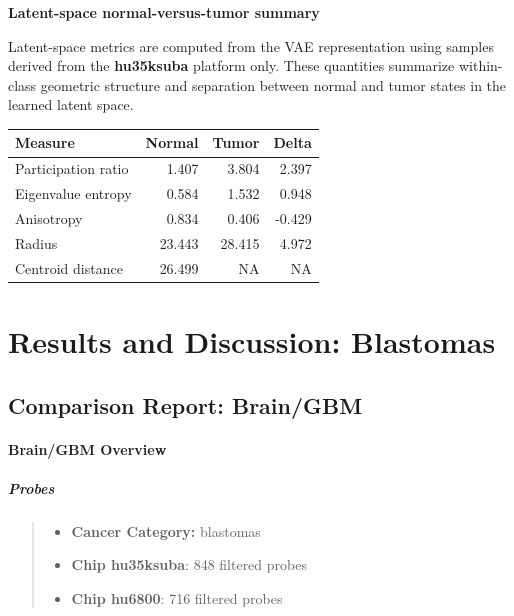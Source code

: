 \documentclass[
  letterpaper,
  DIV=11,
  numbers=noendperiod,
  openany,
  oneside]{scrreprt}
\providecommand{\tightlist}{%
  \setlength{\itemsep}{0pt}\setlength{\parskip}{0pt}}
\begin{document}
\textbf{Latent-space normal-versus-tumor summary}

Latent-space metrics are computed from the VAE representation using
samples derived from the \textbf{hu35ksuba} platform only. These
quantities summarize within-class geometric structure and separation
between normal and tumor states in the learned latent space.

\begin{longtable}[]{@{}lrrr@{}}
\toprule\noalign{}
Measure & Normal & Tumor & Delta \\
\midrule\noalign{}
\endhead
\bottomrule\noalign{}
\endlastfoot
Participation ratio & 1.407 & 3.804 & 2.397 \\
Eigenvalue entropy & 0.584 & 1.532 & 0.948 \\
Anisotropy & 0.834 & 0.406 & -0.429 \\
Radius & 23.443 & 28.415 & 4.972 \\
Centroid distance & 26.499 & NA & NA \\
\end{longtable}

\part{Results and Discussion: Blastomas}

\chapter{Comparison Report: Brain/GBM}\label{comparison-report-braingbm}

\subsection{Brain/GBM Overview}

\subsubsection{Probes}

\begin{quote}
\begin{itemize}
\tightlist
\item
  \textbf{Cancer Category:} blastomas
\item
  \textbf{Chip hu35ksuba}: 848 filtered probes
\item
  \textbf{Chip hu6800}: 716 filtered probes
\end{itemize}
\end{quote}
\end{document}
